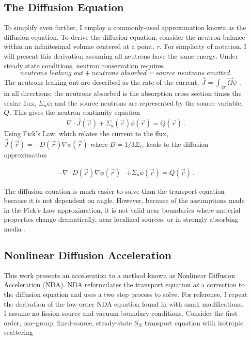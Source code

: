 \subsection{The Diffusion Equation}
To simplify even further, I employ a commonly-used approximation known as the diffusion equation. To derive the diffusion equation, consider the neutron balance within an infinitesimal volume centered at a point, $r$. For simplicity of notation, I will present this derivation assuming all neutrons have the same energy. Under steady state conditions, neutron conservation requires
%
\begin{equation}
    \textit{neutrons leaking out} + \textit{neutrons absorbed} = \textit{source neutrons emitted}.
\end{equation}
The neutrons leaking out are described as the rate of the current, $\vec{J} = \int_{4\pi} \vec{\Omega}\psi$ , in all directions; the neutrons absorbed is the absorption cross section times the scalar flux, $\Sigma_a\phi$; and the source neutrons are represented by the source variable, $Q$. This gives the neutron continuity equation
\begin{equation}
\nabla\cdot \vec{J}(\vec{r}) + \Sigma_a(\vec{r})\phi(\vec{r}) = Q(\vec{r})\:.
\end{equation}
Using Fick's Law, which relates the current to the flux, $\vec{J}(\vec{r}) = -D(\vec{r})\nabla\phi(\vec{r})$ where $D = 1/3\Sigma_t$, leads to the diffusion approximation

\begin{equation}
\begin{split}
 - \nabla \cdot D(\vec{r})\nabla\phi(\vec{r}) &+ \Sigma_a \phi(\vec{r}) = Q(\vec{r})\:.
\end{split}
\label{eq:diffusion_fixed_source}
\end{equation}

The diffusion equation is much easier to solve than the transport equation because it is not dependent on angle. However, because of the assumptions made in the Fick's Law approximation, it is not valid near boundaries where material properties change dramatically, near localized sources, or in strongly absorbing media \cite{lewis-miller}.

\subsection{Nonlinear Diffusion Acceleration}

This work presents an acceleration to a method known as Nonlinear Diffusion Acceleration (NDA). NDA reformulates the transport equation as a correction to the diffusion equation and uses a two step process to solve. For reference, I repeat the derivation of the low-order NDA equation found in \cite{morel-holo} with small modifications. I assume no fission source and vacuum boundary conditions. Consider the first order, one-group, fixed-source, steady-state $S_N$ transport equation with isotropic scattering

